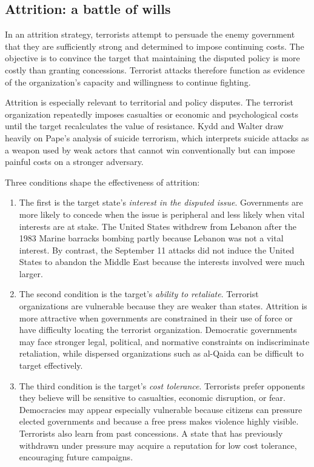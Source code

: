 \subsection{Attrition: a battle of wills}

In an attrition strategy, terrorists attempt to persuade the enemy government that they are sufficiently strong and determined to impose continuing costs. The objective is to convince the target that maintaining the disputed policy is more costly than granting concessions. Terrorist attacks therefore function as evidence of the organization's capacity and willingness to continue fighting.

Attrition is especially relevant to territorial and policy disputes. The terrorist organization repeatedly imposes casualties or economic and psychological costs until the target recalculates the value of resistance. Kydd and Walter draw heavily on Pape's analysis of suicide terrorism, which interprets suicide attacks as a weapon used by weak actors that cannot win conventionally but can impose painful costs on a stronger adversary.

Three conditions shape the effectiveness of attrition:
\begin{enumerate}
    \item The first is the target state's \textit{interest in the disputed issue}. Governments are more likely to concede when the issue is peripheral and less likely when vital interests are at stake. The United States withdrew from Lebanon after the 1983 Marine barracks bombing partly because Lebanon was not a vital interest. By contrast, the September 11 attacks did not induce the United States to abandon the Middle East because the interests involved were much larger.
    
    \item The second condition is the target's \textit{ability to retaliate}. Terrorist organizations are vulnerable because they are weaker than states. Attrition is more attractive when governments are constrained in their use of force or have difficulty locating the terrorist organization. Democratic governments may face stronger legal, political, and normative constraints on indiscriminate retaliation, while dispersed organizations such as al-Qaida can be difficult to target effectively.
    
    \item The third condition is the target's \textit{cost tolerance}. Terrorists prefer opponents they believe will be sensitive to casualties, economic disruption, or fear. Democracies may appear especially vulnerable because citizens can pressure elected governments and because a free press makes violence highly visible. Terrorists also learn from past concessions. A state that has previously withdrawn under pressure may acquire a reputation for low cost tolerance, encouraging future campaigns.
\end{enumerate}

